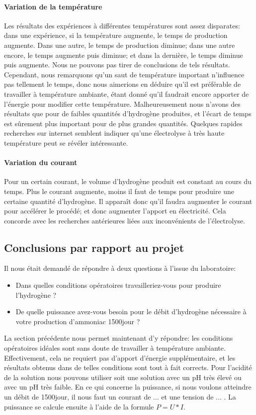 \paragraph{Variation de la température} Les résultats des expériences à différentes températures sont assez disparates:
dans une expérience, si la température augmente, le temps de production augmente. Dans une autre, le temps de production
diminue; dans une autre encore, le temps augmente puis diminue; et dans la dernière, le temps diminue puis augmente.
Nous ne pouvons pas tirer de conclusions de tels résultats. Cependant, nous remarquons qu'un saut de température important
n'influence pas tellement le temps, donc nous aimerions en déduire qu'il est préférable de travailler à température
ambiante, étant donné qu'il faudrait encore apporter de l'énergie pour modifier cette température. Malheureusement 
nous n'avons des résultats que pour de faibles quantités d'hydrogène produites, et l'écart de temps est sûrement plus 
important pour de plus grandes quantités. Quelques rapides recherches sur internet semblent indiquer qu'une électrolyse
à très haute température peut se révéler intéressante\cite{LITEN}.

\paragraph{Variation du courant} Pour un certain courant, le volume d'hydrogène produit est constant au cours du temps.
Plus le courant augmente, moins il faut de temps pour produire une certaine quantité d'hydrogène. Il apparaît donc 
qu'il faudra augmenter le courant pour accélérer le procédé; et donc augmenter l'apport en électricité. Cela concorde 
avec les recherches antérieures liées aux inconvénients de l'électrolyse.

\subsection{Conclusions par rapport au projet}

Il nous était demandé de répondre à deux questions à l'issue du laboratoire:
\begin{itemize}
\item Dans quelles conditions opératoires travailleriez-vous pour produire l’hydrogène ?
\item De quelle puissance avez-vous besoin pour le débit d’hydrogène nécessaire à votre production d’ammoniac \unit{1500}{\tonne \per jour} ? 
\end{itemize}
La section précédente nous permet maintenant d'y répondre: les conditions opératoires idéales sont sans doute
de travailler à température ambiante. Effectivement, cela ne requiert pas d'apport d'énergie supplémentaire, et 
les résultats obtenus dans de telles conditions sont tout à fait corrects. Pour l'acidité de la solution nous pouvons
utiliser soit une solution avec un pH très élevé ou avec un pH très faible. En ce qui concerne la puissance, si nous 
voulons atteindre un débit de \unit{1500}{\tonne \per jour}, il nous faut un courant de ... et une tension de ... . La puissance se calcule ensuite à l'aide de la formule $P = U*I$.
